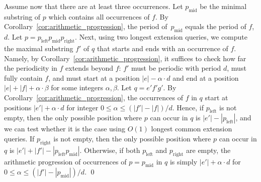 Assume now that there are at least three occurrences. Let $p_{\text{mid}}$ be the minimal substring of $p$ which contains all occurrences of $f$. By Corollary~\ref{cor:arithmetic_progression}, the period of~$p_{\text{mid}}$ equals the period of $f$, $d$. Let $p=p_{\text{left}} p_{\text{mid}} p_{\text{right}}$. Next, using two longest extension queries, we compute the maximal substring $f'$ of $q$ that starts and ends with an occurrence of $f$. Namely, by Corollary~\ref{cor:arithmetic_progression}, it suffices to check how far the periodicity in $f$ extends beyond $f$: $f'$ must be periodic with period $d$, must fully contain $f$, and must start at a position $|e|-\alpha \cdot d$ and end at a position $|e|+|f|+\alpha \cdot \beta$ for some integers $\alpha, \beta$. Let $q = e'f'g'$. By Corollary~\ref{cor:arithmetic_progression}, the occurrences of $f$ in $q$ start at positions $|e'| + \alpha \cdot d$ for integer $0 \leq \alpha \leq (|f'|-|f|)/d$. Hence, if $p_{\text{left}}$ is not empty, then the only possible position where $p$ can occur in $q$ is $|e'|-|p_{\text{left}}|$, and we can test whether it is the case using $O(1)$ longest common extension queries. If $p_{\text{right}}$ is not empty, then the only possible position where $p$ can occur in $q$ is $|e'|+|f'|-|p_{\text{left}} p_{\text{mid}}|$. Otherwise, if both $p_{\text{left}}$ and $p_{\text{right}}$ are empty, the arithmetic progression of occurrences of $p=p_{\text{mid}}$ in $q$ is simply $|e'|+\alpha \cdot d$ for $0 \leq \alpha \leq (|f'|-|p_{\text{mid}}|)/d$. 
\qed